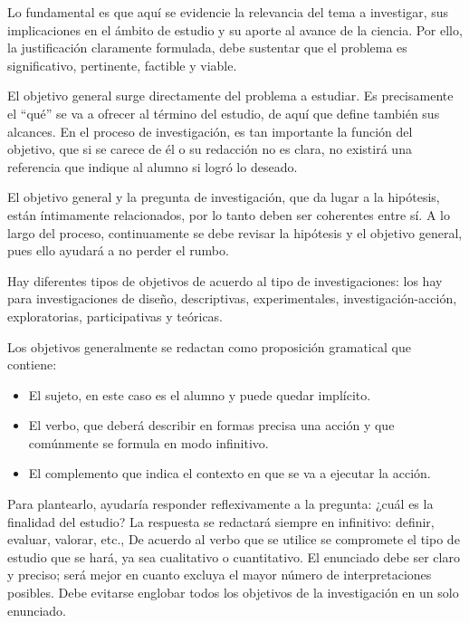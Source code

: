 \documentclass[10pt,a4paper]{protocol}
\begin{document}
Lo fundamental es que aquí se evidencie la relevancia del tema a investigar, sus implicaciones en el ámbito de estudio y su aporte al avance de la ciencia. Por ello, la justificación claramente formulada, debe sustentar que el problema es significativo, pertinente, factible y viable.

El objetivo general surge directamente del problema a estudiar. Es precisamente el “qué” se va a ofrecer al término del estudio, de aquí que define también sus alcances. En el proceso de investigación, es tan importante la función del objetivo, que si se carece de él o su redacción no es clara, no existirá una referencia que indique al alumno si logró lo deseado.\\ \vspace*{0.5cm}

El objetivo general y la pregunta de investigación, que da lugar a la hipótesis, están íntimamente relacionados, por lo tanto deben ser coherentes entre sí. A lo largo del proceso, continuamente se debe revisar la hipótesis y el objetivo general, pues ello ayudará a no perder el rumbo.\\ \vspace*{0.5cm}

Hay diferentes tipos de objetivos de acuerdo al tipo de investigaciones: los hay para investigaciones de diseño, descriptivas, experimentales, investigación-acción, exploratorias, participativas y teóricas.\\ \vspace*{0.5cm}


Los objetivos generalmente se redactan como proposición gramatical que contiene:
\begin{itemize}
	\item El sujeto, en este caso es el alumno y puede quedar implícito.
	\item El verbo, que deberá describir en formas precisa una acción y que comúnmente se formula en modo infinitivo.
	\item El complemento que indica el contexto en que se va a ejecutar la acción.
\end{itemize}

Para plantearlo, ayudaría responder reflexivamente a la pregunta: ¿cuál es la finalidad del estudio? La respuesta se redactará siempre en infinitivo: definir, evaluar, valorar, etc., De acuerdo al verbo que se utilice se compromete el tipo de estudio que se hará, ya sea cualitativo o cuantitativo. El enunciado debe ser claro y preciso; será mejor en cuanto excluya el mayor número de interpretaciones posibles. Debe evitarse englobar todos los objetivos de la investigación en un solo enunciado.\\ \vspace*{0.5cm}
\end{document}
